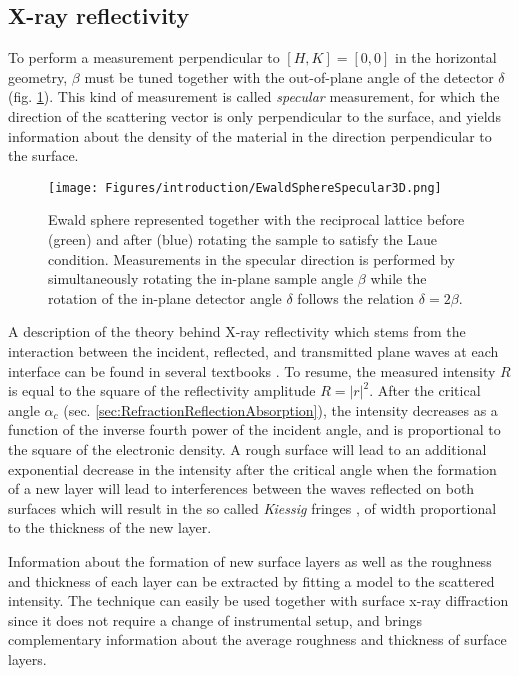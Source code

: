 \subsection{X-ray reflectivity}\label{sec:XRR}

To perform a measurement perpendicular to $[H, K] = [0, 0]$ in the horizontal geometry, $\beta$ must be tuned together with the out-of-plane angle of the detector $\delta$ (fig. \ref{fig:EwaldSphereSpecular}).
This kind of measurement is called \textit{specular} measurement, for which the direction of the scattering vector is only perpendicular to the surface, and yields information about the density of the material in the direction perpendicular to the surface.

\begin{figure}[!htb]
    \centering
    \texttt{[image: Figures/introduction/EwaldSphereSpecular3D.png]}
    \caption{
    Ewald sphere represented together with the reciprocal lattice before (green) and after (blue) rotating the sample to satisfy the Laue condition.
    Measurements in the specular direction is performed by simultaneously rotating the in-plane sample angle $\beta$ while the rotation of the in-plane detector angle $\delta$ follows the relation $\delta=2\beta$.
    }
    \label{fig:EwaldSphereSpecular}
\end{figure}

A description of the theory behind X-ray reflectivity which stems from the interaction between the incident, reflected, and transmitted plane waves at each interface can be found in several textbooks \parencite{Willmott}.
To resume, the measured intensity $R$ is equal to the square of the reflectivity amplitude $R=|r|^2$.
After the critical angle $\alpha_c$ (sec. \ref{sec:RefractionReflectionAbsorption}), the intensity decreases as a function of the inverse fourth power of the incident angle, and is proportional to the square of the electronic density.
A rough surface will lead to an additional exponential decrease in the intensity after the critical angle when the formation of a new layer will lead to interferences between the waves reflected on both surfaces which will result in the so called \textit{Kiessig} fringes \parencite{Kiessig1931}, of width proportional to the thickness of the new layer.

Information about the formation of new surface layers as well as the roughness and thickness of each layer can be extracted by fitting a model to the scattered intensity.
The technique can easily be used together with surface x-ray diffraction since it does not require a change of instrumental setup, and brings complementary information about the average roughness and thickness of surface layers.